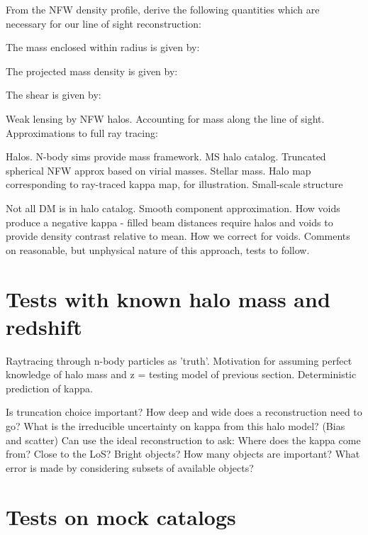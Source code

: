 \documentclass[useAMS,usenatbib]{mn2e}
\begin{document}
From the NFW density profile, \citet{wrightbrainerd1999} derive the following quantities
which are necessary for our line of sight reconstruction:

The mass enclosed within radius is given by:

The projected mass density is given by:

The shear is given by:






Weak lensing by NFW halos. Accounting for mass along the line of sight.
Approximations to full ray tracing:

Halos. N-body sims provide mass framework. MS halo catalog. Truncated spherical
NFW approx based on virial masses. Stellar mass. Halo map corresponding to
ray-traced kappa map, for illustration. Small-scale structure 

Not all DM is in halo catalog. Smooth component approximation.  How voids
produce a negative kappa - filled beam distances require halos and voids to
provide density contrast relative to mean. How we correct for voids. Comments on
reasonable, but unphysical nature of this approach, tests to follow. 



\section{Tests with known halo mass and redshift}
\label{sec:knownMh+z} 

Raytracing through n-body particles as 'truth'. Motivation for assuming perfect
knowledge of halo mass and z = testing model of previous section. Deterministic
prediction of kappa.

Is truncation choice important? How deep and wide does a reconstruction need to
go? What is the irreducible uncertainty on kappa from this halo model? (Bias and
scatter) Can use the ideal reconstruction to ask: Where does the kappa come
from? Close to the LoS? Bright objects? How many objects are important? What
error is made by considering subsets of available objects? 



\section{Tests on mock catalogs}
\label{sec:obsMstar+z}
\end{document}
